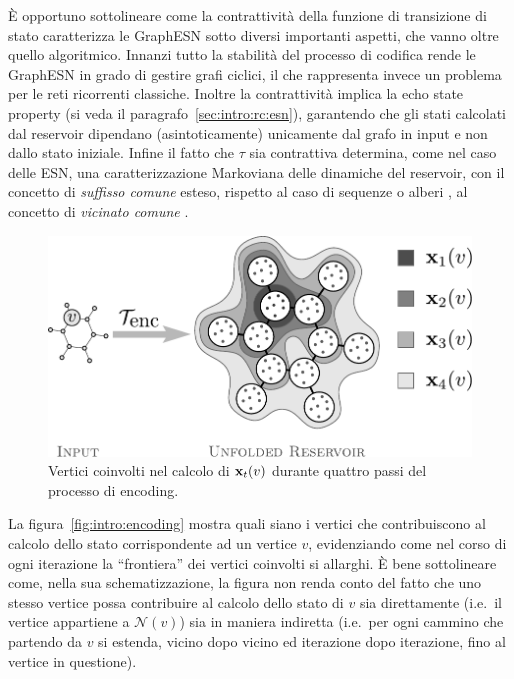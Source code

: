 \`E opportuno sottolineare come la contrattività della funzione di transizione di stato caratterizza le GraphESN sotto diversi importanti aspetti, che vanno oltre quello algoritmico. Innanzi tutto la stabilità del processo di codifica rende le GraphESN in grado di gestire grafi ciclici, il che rappresenta invece un problema per le reti ricorrenti classiche. Inoltre la contrattività implica la echo state property (si veda il paragrafo~\ref{sec:intro:rc:esn}), garantendo che gli stati calcolati dal reservoir dipendano (asintoticamente) unicamente dal grafo in input e non dallo stato iniziale. Infine il fatto che $\tau$ sia contrattiva determina, come nel caso delle ESN, una caratterizzazione Markoviana delle dinamiche del reservoir, con il concetto di \emph{suffisso comune} esteso, rispetto al caso di sequenze \cite{Gallicchio:ArchitecturalAndMarkovian} o alberi \cite{Gallicchio:TreeESN}, al concetto di \emph{vicinato comune} \cite{Gallicchio:GraphESN}. 
\begin{figure}[tbp]
\centering
\includegraphics[width=0.7\columnwidth]{img/encoding-v2}
\medskip
\caption[Encoding di una GraphESN.]{Vertici coinvolti nel calcolo di $\mathbf{x}_t(v)$ durante quattro passi del processo di encoding.}
\label{fig:intro:encoding}
\end{figure}
La figura~\vref{fig:intro:encoding} mostra quali siano i vertici che contribuiscono al calcolo dello stato corrispondente ad un vertice $v$, evidenziando come nel corso di ogni iterazione la ``frontiera'' dei vertici coinvolti si allarghi. \`E bene sottolineare come, nella sua schematizzazione, la figura non renda conto del fatto che uno stesso vertice possa contribuire al calcolo dello stato di $v$ sia direttamente (i.e.\ il vertice appartiene a $\mathcal{N}(v)$) sia in maniera indiretta (i.e.\ per ogni cammino che partendo da $v$ si estenda, vicino dopo vicino ed iterazione dopo iterazione, fino al vertice in questione).


